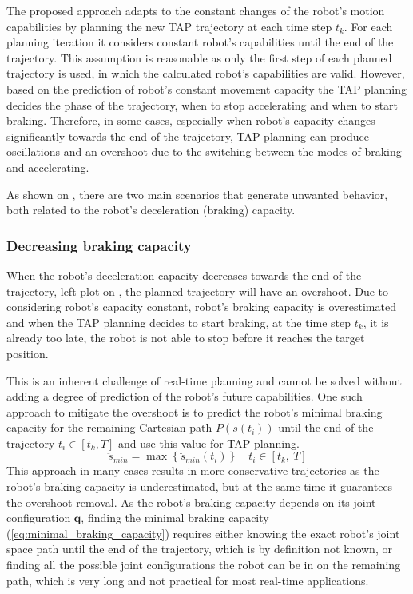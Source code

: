 The proposed approach adapts to the constant changes of the robot's motion capabilities by planning the new TAP trajectory at each time step $t_k$. For each planning iteration it considers constant robot's capabilities until the end of the trajectory. This assumption is reasonable as only the first step of each planned trajectory is used, in which the calculated robot's capabilities are valid. 
However, based on the prediction of robot's constant movement capacity the TAP planning decides the phase of the trajectory, when to stop accelerating and when to start braking. Therefore, in some cases, especially when robot's capacity changes significantly towards the end of the trajectory, TAP planning can produce oscillations and an overshoot due to the switching between the modes of braking and accelerating.

As shown on , there are two main scenarios that generate unwanted behavior, both related to the robot's deceleration (braking) capacity. 

\subsubsection{Decreasing braking capacity} When the robot's deceleration capacity decreases towards the end of the trajectory, left plot on , the planned trajectory will have an overshoot. Due to considering robot's capacity constant, robot's braking capacity is overestimated and when the TAP planning decides to start braking, at the time step $t_k$, it is already too late, the robot is not able to stop before it reaches the target position. 

This is an inherent challenge of real-time planning and cannot be solved without adding a degree of prediction of the robot's future capabilities. One such approach to mitigate the overshoot is to predict the robot's minimal braking capacity for the remaining Cartesian path $P\left(s(t_i)\right)$ until the end of the trajectory $ t_i \in \left[t_k, T\right]$ and use this value for TAP planning.
\begin{equation}
    \ddot{s}_{min} = \max \left\{\ddot{s}_{min}(t_i)\right\} \quad t_i \in \left[t_k ,~ T\right]
\label{eq:minimal_braking_capacity}
\end{equation}
This approach in many cases results in more conservative trajectories as the robot's braking capacity is underestimated, but at the same time it guarantees the overshoot removal. As the robot's braking capacity depends on its joint configuration $\bm{q}$, finding the minimal braking capacity (\ref{eq:minimal_braking_capacity}) requires either knowing the exact robot's joint space path until the end of the trajectory, which is by definition not known, or finding all the possible joint configurations the robot can be in on the remaining path, which is very long and not practical for most real-time applications.

